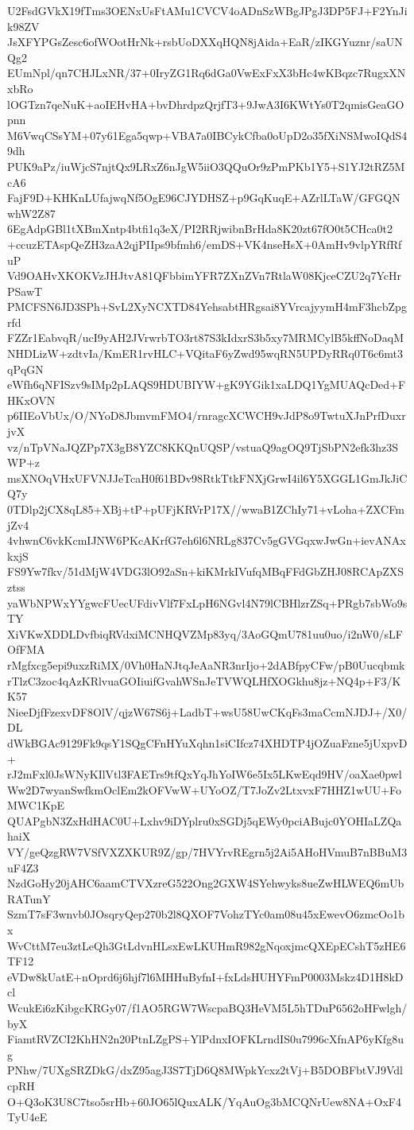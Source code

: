 U2FsdGVkX19fTms3OENxUsFtAMu1CVCV4oADnSzWBgJPgJ3DP5FJ+F2YnJik98ZV
JsXFYPGsZesc6ofWOotHrNk+rsbUoDXXqHQN8jAida+EaR/zIKGYuznr/saUNQg2
EUmNpl/qn7CHJLxNR/37+0IryZG1Rq6dGa0VwExFxX3bHc4wKBqzc7RugxXNxbRo
lOGTzn7qeNuK+aoIEHvHA+bvDhrdpzQrjfT3+9JwA3I6KWtYs0T2qmisGeaGOpnn
M6VwqCSsYM+07y61Ega5qwp+VBA7a0IBCykCfba0oUpD2o35fXiNSMwoIQdS49dh
PUK9aPz/iuWjcS7njtQx9LRxZ6nJgW5iiO3QQuOr9zPmPKb1Y5+S1YJ2tRZ5McA6
FajF9D+KHKnLUfajwqNf5OgE96CJYDHSZ+p9GqKuqE+AZrlLTaW/GFGQNwhW2Z87
6EgAdpGBl1tXBmXntp4btfi1q3eX/PI2RRjwibnBrHda8K20zt67fO0t5CHca0t2
+ccuzETAspQeZH3zaA2qjPIIps9bfmh6/emDS+VK4nseHsX+0AmHv9vlpYRfRfuP
Vd9OAHvXKOKVzJHJtvA81QFbbimYFR7ZXnZVn7RtlaW08KjceCZU2q7YcHrPSawT
PMCFSN6JD3SPh+SvL2XyNCXTD84YehsabtHRgsai8YVrcajyymH4mF3hcbZpgrfd
FZZr1EabvqR/ucI9yAH2JVrwrbTO3rt87S3kIdxrS3b5xy7MRMCylB5kffNoDaqM
NHDLizW+zdtvIa/KmER1rvHLC+VQitaF6yZwd95wqRN5UPDyRRq0T6c6mt3qPqGN
eWfh6qNFISzv9sIMp2pLAQS9HDUBIYW+gK9YGik1xaLDQ1YgMUAQcDed+FHKxOVN
p6IIEoVbUx/O/NYoD8JbmvmFMO4/rnragcXCWCH9vJdP8o9TwtuXJnPrfDuxrjvX
vz/nTpVNaJQZPp7X3gB8YZC8KKQnUQSP/vstuaQ9agOQ9TjSbPN2efk3hz3SWP+z
msXNOqVHxUFVNJJeTcaH0f61BDv98RtkTtkFNXjGrwI4il6Y5XGGL1GmJkJiCQ7y
0TDlp2jCX8qL85+XBj+tP+pUFjKRVrP17X//wwaB1ZChIy71+vLoha+ZXCFmjZv4
4vhwnC6vkKcmIJNW6PKcAKrfG7eh6l6NRLg837Cv5gGVGqxwJwGn+ievANAxkxjS
FS9Yw7fkv/51dMjW4VDG3lO92aSn+kiKMrkIVufqMBqFFdGbZHJ08RCApZXSztss
yaWbNPWxYYgwcFUecUFdivVlf7FxLpH6NGvl4N79lCBHlzrZSq+PRgb7sbWo9sTY
XiVKwXDDLDvfbiqRVdxiMCNHQVZMp83yq/3AoGQmU781uu0uo/i2nW0/sLFOfFMA
rMgfxcg5epi9uxzRiMX/0Vh0HaNJtqJeAaNR3nrIjo+2dABfpyCFw/pB0Uucqbmk
rTlzC3zoc4qAzKRlvuaGOIiuifGvahWSnJeTVWQLHfXOGkhu8jz+NQ4p+F3/KK57
NieeDjfFzexvDF8OlV/qjzW67S6j+LadbT+wsU58UwCKqFs3maCcmNJDJ+/X0/DL
dWkBGAc9129Fk9qsY1SQgCFnHYuXqhn1siCIfcz74XHDTP4jOZuaFzne5jUxpvD+
rJ2mFxl0JsWNyKIlVtl3FAETrs9tfQxYqJhYoIW6e5Ix5LKwEqd9HV/oaXae0pwl
Ww2D7wyanSwfkmOclEm2kOFVwW+UYoOZ/T7JoZv2LtxvxF7HHZ1wUU+FoMWC1KpE
QUAPgbN3ZxHdHAC0U+Lxhv9iDYplru0xSGDj5qEWy0pciABujc0YOHIaLZQahaiX
VY/geQzgRW7VSfVXZXKUR9Z/gp/7HVYrvREgrn5j2Ai5AHoHVmuB7nBBuM3uF4Z3
NzdGoHy20jAHC6aamCTVXzreG522Ong2GXW4SYehwyks8ueZwHLWEQ6mUbRATunY
SzmT7sF3wnvb0JOsqryQep270b2l8QXOF7VohzTYc0am08u45xEwevO6zmcOo1bx
WvCttM7eu3ztLeQh3GtLdvnHLsxEwLKUHmR982gNqoxjmcQXEpECshT5zHE6TF12
eVDw8kUatE+nOprd6j6hjf7l6MHHuByfnI+fxLdsHUHYFmP0003Mskz4D1H8kDcl
WcukEi6zKibgcKRGy07/f1AO5RGW7WscpaBQ3HeVM5L5hTDuP6562oHFwlgh/byX
FiamtRVZCI2KhHN2n20PtnLZgPS+YlPdnxIOFKLrndIS0u7996cXfnAP6yKfg8ug
PNhw/7UXgSRZDkG/dxZ95agJ3S7TjD6Q8MWpkYcxz2tVj+B5DOBFbtVJ9VdlcpRH
O+Q3oK3U8C7tso5srHb+60JO65lQuxALK/YqAuOg3bMCQNrUew8NA+OxF4TyU4eE
